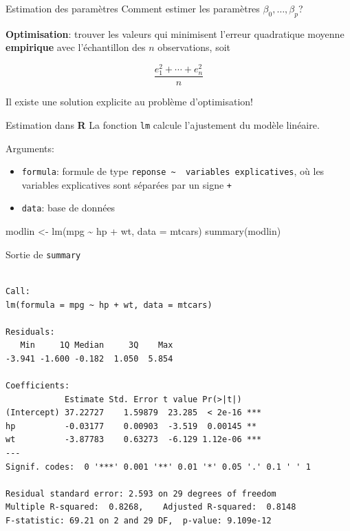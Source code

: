 \documentclass[
  ignorenonframetext,
]{beamer}
\newenvironment{Shaded}{\begin{snugshade}}{\end{snugshade}}
\newcommand{\AttributeTok}[1]{\textcolor[rgb]{0.40,0.45,0.13}{#1}}
\newcommand{\FunctionTok}[1]{\textcolor[rgb]{0.28,0.35,0.67}{#1}}
\newcommand{\NormalTok}[1]{\textcolor[rgb]{0.00,0.23,0.31}{#1}}
\newcommand{\OtherTok}[1]{\textcolor[rgb]{0.00,0.23,0.31}{#1}}
\newcommand{\SpecialCharTok}[1]{\textcolor[rgb]{0.37,0.37,0.37}{#1}}
\providecommand{\tightlist}{%
  \setlength{\itemsep}{0pt}\setlength{\parskip}{0pt}}\usepackage{longtable,booktabs,array}
\begin{document}
\begin{frame}{Estimation des paramètres}
\protect\hypertarget{estimation-des-paramuxe8tres}{}
Comment estimer les paramètres \(\beta_0, \ldots, \beta_p\)?

\textbf{Optimisation}: trouver les valeurs qui minimisent l'erreur
quadratique moyenne \textbf{empirique} avec l'échantillon des \(n\)
observations, soit

\[\frac{e_1^2 + \cdots + e_n^2}{n}\]

Il existe une solution explicite au problème d'optimisation!
\end{frame}

\begin{frame}[fragile]{Estimation dans \textbf{R}}
\protect\hypertarget{estimation-dans-r}{}
La fonction \texttt{lm} calcule l'ajustement du modèle linéaire.

Arguments:

\begin{itemize}
\tightlist
\item
  \texttt{formula}: formule de type
  \texttt{reponse\ \textasciitilde{}\ \ variables\ explicatives}, où les
  variables explicatives sont séparées par un signe \texttt{+}
\item
  \texttt{data}: base de données
\end{itemize}

\begin{Shaded}
\begin{Highlighting}[numbers=left,,]
\NormalTok{modlin }\OtherTok{\textless{}{-}} \FunctionTok{lm}\NormalTok{(mpg }\SpecialCharTok{\textasciitilde{}}\NormalTok{ hp }\SpecialCharTok{+}\NormalTok{ wt, }
             \AttributeTok{data =}\NormalTok{ mtcars)}
\FunctionTok{summary}\NormalTok{(modlin)}
\end{Highlighting}
\end{Shaded}
\end{frame}

\begin{frame}[fragile]{Sortie de \texttt{summary}}
\protect\hypertarget{sortie-de-summary}{}
\footnotesize

\begin{verbatim}

Call:
lm(formula = mpg ~ hp + wt, data = mtcars)

Residuals:
   Min     1Q Median     3Q    Max 
-3.941 -1.600 -0.182  1.050  5.854 

Coefficients:
            Estimate Std. Error t value Pr(>|t|)    
(Intercept) 37.22727    1.59879  23.285  < 2e-16 ***
hp          -0.03177    0.00903  -3.519  0.00145 ** 
wt          -3.87783    0.63273  -6.129 1.12e-06 ***
---
Signif. codes:  0 '***' 0.001 '**' 0.01 '*' 0.05 '.' 0.1 ' ' 1

Residual standard error: 2.593 on 29 degrees of freedom
Multiple R-squared:  0.8268,    Adjusted R-squared:  0.8148 
F-statistic: 69.21 on 2 and 29 DF,  p-value: 9.109e-12
\end{verbatim}

\normalsize
\end{frame}
\end{document}
